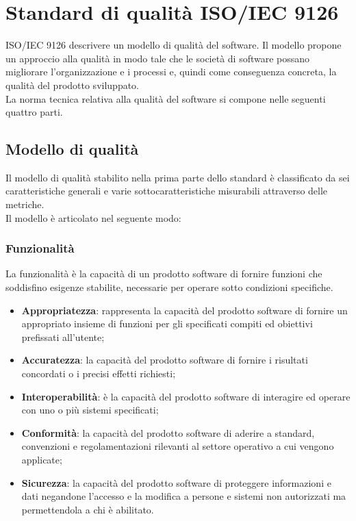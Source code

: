 \section{Standard di qualità ISO/IEC 9126}
ISO/IEC 9126 descrivere un modello di qualità del software. Il modello propone un approccio alla qualità in modo tale che le società di software possano migliorare l'organizzazione e i processi e, quindi come conseguenza concreta, la qualità del prodotto sviluppato. \\
La norma tecnica relativa alla qualità del software si compone nelle seguenti quattro parti.

\subsection{Modello di qualità}
Il modello di qualità stabilito nella prima parte dello standard è classificato da sei caratteristiche generali e varie sottocaratteristiche misurabili attraverso delle metriche. \\
Il modello è articolato nel seguente modo:

\subsubsection{Funzionalità}
La funzionalità è la capacità di un prodotto software di fornire funzioni che soddisfino esigenze stabilite, necessarie per operare sotto condizioni specifiche.

\begin{itemize}

	\item \textbf{Appropriatezza}: rappresenta la capacità del prodotto software di fornire un appropriato insieme di funzioni per gli specificati compiti ed obiettivi prefissati all'utente;
	
    \item \textbf{Accuratezza}: la capacità del prodotto software di fornire i risultati concordati o i precisi effetti richiesti;
    
    \item \textbf{Interoperabilità}: è la capacità del prodotto software di interagire ed operare con uno o più sistemi specificati;
    
    \item \textbf{Conformità}: la capacità del prodotto software di aderire a standard, convenzioni e regolamentazioni rilevanti al settore operativo a cui vengono applicate;
    
    \item \textbf{Sicurezza}: la capacità del prodotto software di proteggere informazioni e dati negandone l'accesso e la modifica a persone e sistemi non autorizzati ma permettendola a chi è abilitato.    
\end{itemize}


